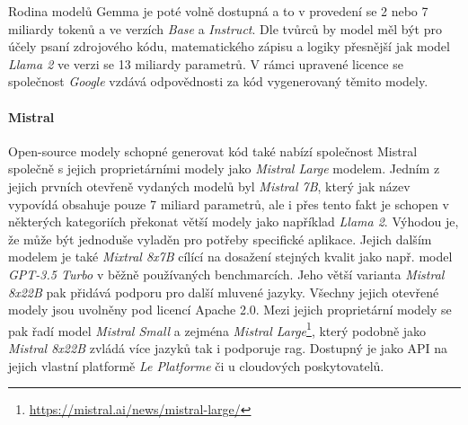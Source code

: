 \documentclass[czech, ma, kiv, he, iso690numb, pdf, viewonly]{fasthesis}
\begin{document}
    Rodina modelů Gemma je poté volně dostupná a to v provedení se 2 nebo 7 miliardy tokenů a ve verzích \textit{Base} a \textit{Instruct}. Dle tvůrců by model měl být pro účely psaní zdrojového kódu, matematického zápisu a logiky přesnější jak model \textit{Llama 2} ve verzi se 13 miliardy parametrů. \cite{gemma_introduction} V rámci upravené licence se společnost \textit{Google} vzdává odpovědnosti za kód vygenerovaný těmito modely.

    \paragraph{Mistral} Open-source modely schopné generovat kód také nabízí společnost Mistral společně s jejich proprietárními modely jako \textit{Mistral Large} modelem. Jedním z jejich prvních otevřeně vydaných modelů byl \textit{Mistral 7B}, který jak název vypovídá obsahuje pouze 7 miliard parametrů, ale i přes tento fakt je schopen v některých kategoriích překonat větší modely jako například \textit{Llama 2}. \cite{jiang2023mistral} Výhodou je, že může být jednoduše vyladěn pro potřeby specifické aplikace. Jejich dalším modelem je také \textit{Mixtral 8x7B} cílící na dosažení stejných kvalit jako např. model \textit{GPT-3.5 Turbo} v běžně používaných benchmarcích. Jeho větší varianta \textit{Mistral 8x22B} pak přidává podporu pro další mluvené jazyky. \cite{jiang2024mixtral} Všechny jejich otevřené modely jsou uvolněny pod licencí Apache 2.0. Mezi jejich proprietární modely se pak řadí model \textit{Mistral Small} a zejména \textit{Mistral Large}\footnote{\url{https://mistral.ai/news/mistral-large/}}, který podobně jako \textit{Mistral 8x22B} zvládá více jazyků tak i podporuje \Gls{rag}. Dostupný je jako API na jejich vlastní platformě \textit{Le Platforme} či u cloudových poskytovatelů.

        \newpage
\end{document}
